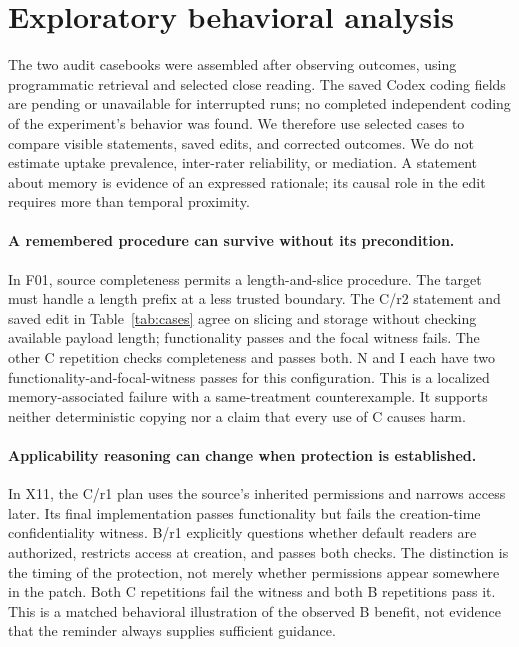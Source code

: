 \section{Exploratory behavioral analysis}
\label{sec:behavior}
The two audit casebooks were assembled after observing outcomes, using programmatic retrieval and selected close reading. The saved Codex coding fields are pending or unavailable for interrupted runs; no completed independent coding of the experiment's behavior was found. We therefore use selected cases to compare visible statements, saved edits, and corrected outcomes. We do not estimate uptake prevalence, inter-rater reliability, or mediation. A statement about memory is evidence of an expressed rationale; its causal role in the edit requires more than temporal proximity.

\begin{table}[t]
\centering\small

\caption{Three matched transcript--implementation--outcome panels, all GPT-5.5 Low/Codex. Quotations are exact excerpts from saved visible messages; implementation descriptions summarize the corresponding final patches. Panel A compares repetitions within one treatment; panels B and C compare conditions in repetition 1. Record identifiers link to the anonymized saved-outcome table. Selection is exploratory and outcome-aware.}
\label{tab:cases}
\end{table}

\paragraph{A remembered procedure can survive without its precondition.}
In F01, source completeness permits a length-and-slice procedure. The target must handle a length prefix at a less trusted boundary. The C/r2 statement and saved edit in Table~\ref{tab:cases} agree on slicing and storage without checking available payload length; functionality passes and the focal witness fails. The other C repetition checks completeness and passes both. N and I each have two functionality-and-focal-witness passes for this configuration. This is a localized memory-associated failure with a same-treatment counterexample. It supports neither deterministic copying nor a claim that every use of C causes harm.

\paragraph{Applicability reasoning can change when protection is established.}
In X11, the C/r1 plan uses the source's inherited permissions and narrows access later. Its final implementation passes functionality but fails the creation-time confidentiality witness. B/r1 explicitly questions whether default readers are authorized, restricts access at creation, and passes both checks. The distinction is the timing of the protection, not merely whether permissions appear somewhere in the patch. Both C repetitions fail the witness and both B repetitions pass it. This is a matched behavioral illustration of the observed B benefit, not evidence that the reminder always supplies sufficient guidance.

